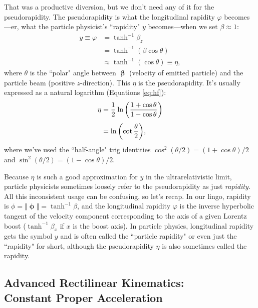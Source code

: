 \documentclass[12pt]{article}
\newcommand{\vvbeta}{\bm{\upbeta}}
\begin{document}
That was a productive diversion, but we don't need any of it for the pseudorapidity. The pseudorapidity is what the longitudinal rapidity $\varphi$ becomes---er, what the particle physicist's ``rapidity" $y$ becomes---when we set $\beta \approx 1$:
\begin{equation*}
\begin{aligned}
y \equiv \varphi &= \tanh^{-1} \beta_z \\
&= \tanh^{-1} ( \beta \cos{\theta} ) \\
& \approx  \tanh^{-1} ( \cos{\theta} ) \equiv \eta ,
\end{aligned}
\end{equation*}
where $\theta$ is the ``polar" angle between $\vvbeta$ (velocity of emitted particle) and the particle beam (positive $z$-direction). This $\eta$ is the pseudorapidity. It's usually expressed as a natural logarithm (Equations \ref{eq:hf}):
\begin{equation*}
\begin{split}
\eta &= \dfrac{1}{2} \mkern1mu \ln{ \left( \dfrac{1 + \cos{\theta}}{1 - \cos{\theta}} \right) } \\[3pt]
&= \ln{ \left( \cot {\dfrac{\theta}{2}} \right) },
\end{split}
\end{equation*}
where we've used the ``half-angle" trig identities $\cos^2{(\theta / 2)} = (1 + \cos{\theta})/2$ and $\sin^2{(\theta / 2)} = (1 - \cos{\theta})/2$.

Because $\eta$ is such a good approximation for $y$ in the ultrarelativistic limit, particle physicists sometimes loosely refer to the pseudorapidity as just \emph{rapidity}. All this inconsistent usage can be confusing, so let's recap. In our lingo, rapidity is $\phi = \Vert \bm{\upphi} \Vert = \tanh^{-1}{\beta}$, and the longitudinal rapidity $\varphi$ is the inverse hyperbolic tangent of the velocity component corresponding to the axis of a given Lorentz boost ($\tanh^{-1}{\beta_x}$ if $x$ is the boost axis). In particle physics, longitudinal rapidity gets the symbol $y$ and is often called the ``particle rapidity" or even just the ``rapidity" for short, although the pseudorapidity $\eta$ is also sometimes called the rapidity.


\subsection{Advanced Rectilinear Kinematics:\\ Constant Proper Acceleration}\label{ssec:ak}
\end{document}
